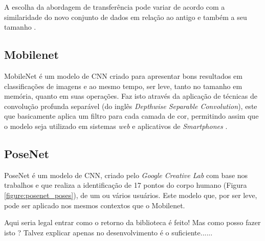 \par A escolha da abordagem de transferência pode variar de acordo com a similaridade do novo conjunto de dados em relação ao antigo e também a seu tamanho \cite{Carneiro2017}.


\subsection{Mobilenet}

\par MobileNet é um modelo de CNN criado para apresentar bons resultados em classificações de imagens e ao mesmo tempo, ser leve, tanto no tamanho em memória, quanto em suas operações. Faz isto através da aplicação de técnicas de convolução profunda separável (do inglês \textit{Depthwise Separable Convolution}), este que basicamente aplica um filtro para cada camada de cor, permitindo assim que o modelo seja utilizado em sistemas \textit{web} e aplicativos de \textit{Smartphones} \cite{howard2017mobilenets}.

\subsection{PoseNet}

\par PoseNet é um modelo de CNN, criado pelo \textit{Google Creative Lab} com base nos trabalhos \cite{george2017} e \cite{george2018} que realiza a identificação de 17 pontos do corpo humano (Figura \ref{figure:posenet_poses}), de um ou vários usuários. Este modelo que, por ser leve, pode ser aplicado nos mesmos contextos que o Mobilenet.


\par Aqui seria legal entrar como o retorno da biblioteca é feito! Mas como posso fazer isto ? Talvez explicar apenas no desenvolvimento é o suficiente......

